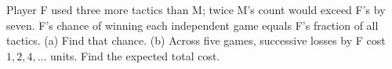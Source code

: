 Player F used three more tactics than M; twice M's count would exceed F's by seven. F's chance of winning each independent game equals F's fraction of all tactics. (a) Find that chance. (b) Across five games, successive losses by F cost $1,2,4,\ldots$ units. Find the expected total cost.
